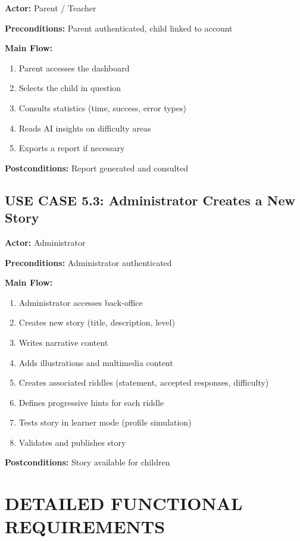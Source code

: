 \documentclass[12pt,a4paper]{article}
\begin{document}
\textbf{Actor:} Parent / Teacher

\textbf{Preconditions:} Parent authenticated, child linked to account

\textbf{Main Flow:}
\begin{enumerate}
    \item Parent accesses the dashboard
    \item Selects the child in question
    \item Consults statistics (time, success, error types)
    \item Reads AI insights on difficulty areas
    \item Exports a report if necessary
\end{enumerate}

\textbf{Postconditions:} Report generated and consulted

\subsection{USE CASE 5.3: Administrator Creates a New Story}

\textbf{Actor:} Administrator

\textbf{Preconditions:} Administrator authenticated

\textbf{Main Flow:}
\begin{enumerate}
    \item Administrator accesses back-office
    \item Creates new story (title, description, level)
    \item Writes narrative content
    \item Adds illustrations and multimedia content
    \item Creates associated riddles (statement, accepted responses, difficulty)
    \item Defines progressive hints for each riddle
    \item Tests story in learner mode (profile simulation)
    \item Validates and publishes story
\end{enumerate}

\textbf{Postconditions:} Story available for children


\newpage

\section{DETAILED FUNCTIONAL REQUIREMENTS}
\end{document}
